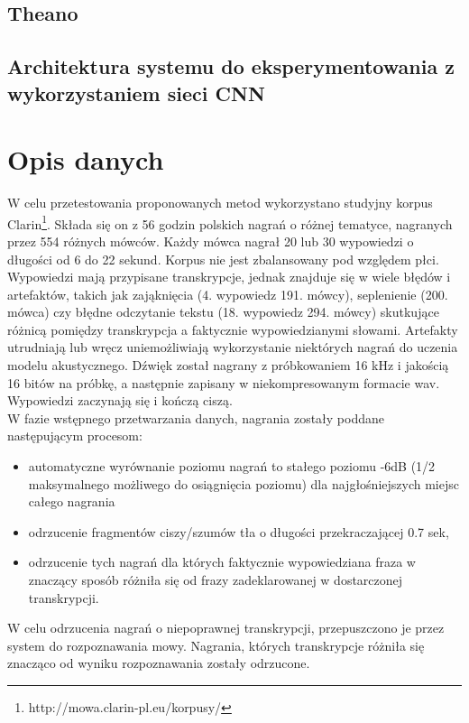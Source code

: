 \documentclass[11pt]{article}
\begin{document}
	\subsection{ Theano }
	\subsection{ Architektura systemu do eksperymentowania z wykorzystaniem sieci CNN }
		
\section{Opis danych}
	\label{sec:opis_danych}

	W celu przetestowania proponowanych metod wykorzystano studyjny korpus Clarin\footnote{http://mowa.clarin-pl.eu/korpusy/}. Składa się on z 56 godzin polskich nagrań o różnej tematyce, nagranych przez 554 różnych mówców. Każdy mówca nagrał 20 lub 30 wypowiedzi o długości od 6 do 22 sekund. Korpus nie jest zbalansowany pod względem płci. Wypowiedzi mają przypisane transkrypcje, jednak znajduje się w wiele błędów i artefaktów, takich jak zająknięcia (4. wypowiedz 191. mówcy), seplenienie (200. mówca) czy błędne odczytanie tekstu (18. wypowiedz 294. mówcy) skutkujące różnicą pomiędzy transkrypcja a faktycznie wypowiedzianymi słowami. Artefakty utrudniają lub wręcz uniemożliwiają wykorzystanie niektórych nagrań do uczenia modelu akustycznego. Dźwięk został nagrany z próbkowaniem 16 kHz i jakością 16 bitów na próbkę, a następnie zapisany w niekompresowanym formacie wav. Wypowiedzi zaczynają się i kończą ciszą. 
\\
W fazie wstępnego przetwarzania danych, nagrania zostały poddane następującym procesom:
\begin{itemize}
	\item automatyczne wyrównanie poziomu nagrań to stałego poziomu -6dB (1/2 maksymalnego możliwego do osiągnięcia poziomu) dla najgłośniejszych miejsc całego nagrania
	\item odrzucenie fragmentów ciszy/szumów tła o długości przekraczającej 0.7 sek,
	\item odrzucenie tych nagrań dla których faktycznie wypowiedziana fraza w znaczący sposób różniła się od frazy zadeklarowanej w dostarczonej transkrypcji.
\end{itemize}
W celu odrzucenia nagrań o niepoprawnej transkrypcji, przepuszczono je przez system do rozpoznawania mowy. Nagrania, których transkrypcje różniła się znacząco od wyniku rozpoznawania zostały odrzucone.
\end{document}

